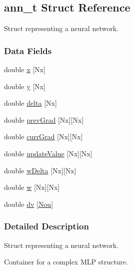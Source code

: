 \hypertarget{structann__t}{\subsection{ann\+\_\+t Struct Reference}
\label{structann__t}
}


Struct representing a neural network.  


\subsubsection*{Data Fields}
\begin{DoxyCompactItemize}
\item 
double \hyperlink{structann__t_ac566dbcdd25e058c1e82f59d63dfd12b}{x} \mbox{[}Nx\mbox{]}
\item 
double \hyperlink{structann__t_adec9cbbd838a286742a4ae286bff0e30}{y} \mbox{[}Nx\mbox{]}
\item 
double \hyperlink{structann__t_a610000125df6a3004a1a0768bee350be}{delta} \mbox{[}Nx\mbox{]}
\item 
double \hyperlink{structann__t_ae668825bd99ec5a8e701cd34833d92c8}{prev\+Grad} \mbox{[}Nx\mbox{]}\mbox{[}Nx\mbox{]}
\item 
double \hyperlink{structann__t_ad634fb273a77c89ef50752fe62499b4f}{curr\+Grad} \mbox{[}Nx\mbox{]}\mbox{[}Nx\mbox{]}
\item 
double \hyperlink{structann__t_a56f1cf095bad5da7e0c944dd9727293a}{update\+Value} \mbox{[}Nx\mbox{]}\mbox{[}Nx\mbox{]}
\item 
double \hyperlink{structann__t_a19e899724a3a7ab9150e22e0d48ebc3e}{w\+Delta} \mbox{[}Nx\mbox{]}\mbox{[}Nx\mbox{]}
\item 
double \hyperlink{structann__t_aee905c93142ba709a90118c788622185}{w} \mbox{[}Nx\mbox{]}\mbox{[}Nx\mbox{]}
\item 
double \hyperlink{structann__t_a3cd26d516c0d78e0bd8e83f7b5d96056}{dv} \mbox{[}\hyperlink{rprop_8c_aeb7e0ca9a50d320cdc1d35a4bfe4f06b}{Nou}\mbox{]}
\end{DoxyCompactItemize}


\subsubsection{Detailed Description}
Struct representing a neural network. 

Container for a complex M\+L\+P structure. 

